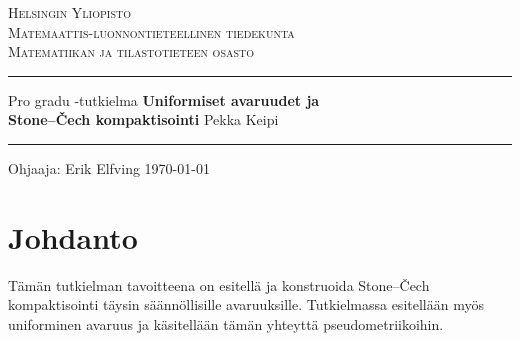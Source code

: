 \documentclass[12pt,a4paper,leqno]{report}
\theoremstyle{plain}
\theoremstyle{definition}
\theoremstyle{remark}
\begin{document}
\begin{titlepage}
  \setlength{\parindent}{0mm}
  \sloppy
  \large \textsc{Helsingin Yliopisto \\
                 Matemaattis-luonnontieteellinen tiedekunta \\
                 Matematiikan ja tilastotieteen osasto}
  \vspace{5mm}
  \hrule height3pt
  \vspace{20mm}
  \begin{center}
    \large Pro gradu -tutkielma
    \linebreak \vfill   
    \huge \textbf{Uniformiset avaruudet ja \\
                  Stone–Čech kompaktisointi}
    \vspace{20mm} \linebreak
    \Large Pekka Keipi \linebreak
    \vfill
  \end{center}
  \hrule height2pt
  \vspace{15mm}
  Ohjaaja: Erik Elfving
  \hfill
  \today
\end{titlepage}

\tableofcontents

\chapter{Johdanto}\label{johd}


Tämän tutkielman tavoitteena on esitellä ja konstruoida Stone–Čech kompaktisointi täysin säännöllisille avaruuksille. Tutkielmassa esitellään myös uniforminen avaruus ja käsitellään tämän yhteyttä pseudometriikoihin. 
\end{document}
